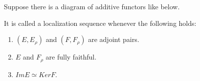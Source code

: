 \documentclass[../../../thesis.tex]{subfiles}
\begin{document}
            \begin{definition}
                Suppose there is a diagram of additive functors like below.
                \begin{center}
                \end{center}
                It is called a localization sequence whenever the following holds:
                \begin{enumerate}
                    \item $(E,E_\rho)$ and $(F,F_\rho)$ are adjoint pairs.
                    \item $E$ and $F_\rho$ are fully faithful.
                    \item $ImE \simeq KerF$.
                \end{enumerate}
            \end{definition}
\end{document}
